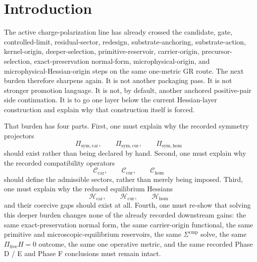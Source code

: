 \documentclass[11pt]{article}
\newcommand{\UltraFunctional}{\mathscr F_{\mathrm{micro}}}
\newcommand{\RootFunctional}{\mathscr F_{\mathrm{hess}}}
\newcommand{\UltraTensor}{\mathfrak M}
\newcommand{\UltraRelabel}{\mathfrak N}
\newcommand{\UltraFree}{\mathfrak P}
\newcommand{\TensorSymProj}{\Pi_{\mathrm{sym,car}}}
\newcommand{\CurSymProj}{\Pi_{\mathrm{sym,cur}}}
\newcommand{\HomSymProj}{\Pi_{\mathrm{sym,hom}}}
\newcommand{\TensorCompat}{\mathcal C_{\mathrm{car}}}
\newcommand{\CurCompat}{\mathcal C_{\mathrm{cur}}}
\newcommand{\HomCompat}{\mathcal C_{\mathrm{hom}}}
\newcommand{\TensorHess}{\mathcal H_{\mathrm{car}}}
\newcommand{\CurHess}{\mathcal H_{\mathrm{cur}}}
\newcommand{\HomHess}{\mathcal H_{\mathrm{hom}}}
\begin{document}
\begin{abstract}
After reduction to those stationary unsuppressed sectors, the deeper selection functional becomes exactly the same recorded Hessian-layer functional
\[
\RootFunctional[\UltraTensor,\UltraRelabel,\UltraFree].
\]
By the previous note, that is exactly the same microphysical exact-preservation functional
\[
\UltraFunctional[\UltraTensor,\UltraRelabel,\UltraFree].
\]
Therefore the same exact-preservation normal form, the same carrier-origin functional, the same primitive reservoir, the same microscopic-equilibrium reservoir, the same \(\Sigma^{\mathrm{cmp}}\) solve, the same \(\Pi_{\mathrm{free}}H=0\) outcome, the same substrate and observer solves, the same one operative metric, and the recorded Phase D / E and Phase F gains are all preserved unchanged.

The scope remains disciplined. This note does not claim a final ultraviolet completion or a unique ultimate substrate theory. Its exact positive claim is narrower: the symmetry-projector / compatibility-kernel / reduced-Hessian package of the previous note is no longer primitive at current scope, but is itself the reduced stationary output of a still more primitive symmetry-charge / compatibility-response layer while preserving the same downstream package.
\end{abstract}

\section{Introduction}

The active charge-polarization line has already crossed the candidate, gate, controlled-limit, residual-sector, redesign, substrate-anchoring, substrate-action, kernel-origin, deeper-selection, primitive-reservoir, carrier-origin, precursor-selection, exact-preservation normal-form, microphysical-origin, and microphysical-Hessian-origin steps on the same one-metric GR route. The next burden therefore sharpens again. It is not another packaging pass. It is not stronger promotion language. It is not, by default, another anchored positive-pair side continuation. It is to go one layer below the current Hessian-layer construction and explain why that construction itself is forced.

That burden has four parts. First, one must explain why the recorded symmetry projectors
\[
\TensorSymProj,\qquad
\CurSymProj,\qquad
\HomSymProj
\]
should exist rather than being declared by hand. Second, one must explain why the recorded compatibility operators
\[
\TensorCompat,\qquad
\CurCompat,\qquad
\HomCompat
\]
should define the admissible sectors, rather than merely being imposed. Third, one must explain why the reduced equilibrium Hessians
\[
\TensorHess,\qquad
\CurHess,\qquad
\HomHess
\]
and their coercive gaps should exist at all. Fourth, one must re-show that solving this deeper burden changes none of the already recorded downstream gains: the same exact-preservation normal form, the same carrier-origin functional, the same primitive and microscopic-equilibrium reservoirs, the same \(\Sigma^{\mathrm{cmp}}\) solve, the same \(\Pi_{\mathrm{free}}H=0\) outcome, the same one operative metric, and the same recorded Phase D / E and Phase F conclusions must remain intact.
\end{document}

